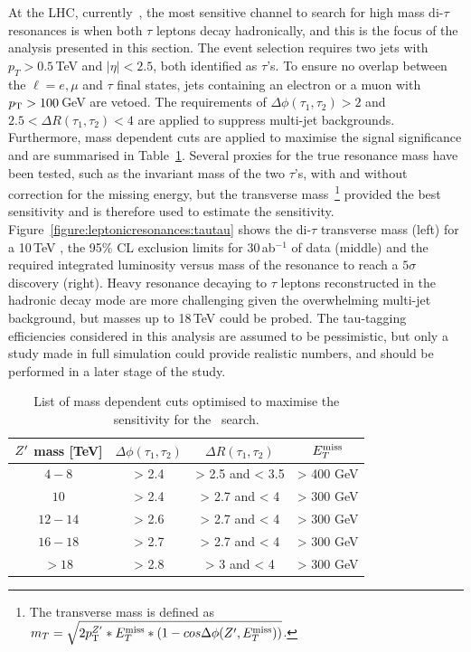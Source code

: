 At the LHC, currently~\cite{Khachatryan:2016qkc}, the most sensitive channel to search for high mass di-$\tau$ resonances is when both $\tau$ leptons decay hadronically, and this is the focus of the analysis presented in this section. The event selection requires two jets with $p_{T} > 0.5$\,TeV and $|\eta|<2.5$, both identified as $\tau$'s. To ensure no overlap between the $\ell=e,\mu$ and $\tau$ final states, jets containing an electron or a muon with $p_{\text{T}} > 100$\,GeV are vetoed. The requirements of $\Delta \phi(\tau_1, \tau_2)> 2$ and $2.5<\Delta R(\tau_1, \tau_2)<4$ are applied to suppress multi-jet backgrounds. Furthermore, mass dependent cuts are applied to maximise the signal significance and are summarised in Table~\ref{tab:leptonicresonances:tautau}. Several proxies for the true resonance mass have been tested, such as the invariant mass of the two $\tau$'s, with and without correction for the missing energy, but the transverse mass~\footnote{The transverse mass is defined as $m_{T}  =  \sqrt{2p_{\text{T}}^{Z^{\prime}}*E_{T}^{\rm{miss}}*(1-cos\Delta\phi(Z^{\prime},E_{T}^{\rm{miss}}))} $.} provided the best sensitivity and is therefore used to estimate the sensitivity.
Figure~\ref{figure:leptonicresonances:tautau} shows the di-$\tau$ transverse mass (left) for a 10\,TeV \ZpSSM, the 95\% CL exclusion limits for 30\,ab$^{-1}$ of data (middle) and the required integrated luminosity versus mass of the resonance to reach a $5\sigma$ discovery (right). Heavy resonance decaying to $\tau$ leptons reconstructed in the hadronic decay mode are more challenging given the overwhelming multi-jet background, but masses up to 18\,TeV could be probed. The tau-tagging efficiencies considered in this analysis are assumed to be pessimistic, but only a study made in full simulation could provide realistic numbers, and should be performed in a later stage of the study.

\begin{table}[htb!]
   \centering
\begin{tabular}{c|c|c|c}
   $Z^{\prime}$ mass [TeV] &  $\Delta \phi(\tau_1, \tau_2)$&  $\Delta R(\tau_1, \tau_2)$ & $E_{T}^{\rm{miss}}$\\
  \hline
  \hline
  $4-8$ & > 2.4 & > 2.5 and < 3.5 & > 400 GeV\\
  $10$ & > 2.4 & > 2.7 and < 4 & > 300 GeV\\
  $12-14$ & > 2.6 & > 2.7 and < 4 & > 300 GeV\\
  $16-18$ & > 2.7 & > 2.7 and < 4 & > 300 GeV\\
  $>18$ & > 2.8 & > 3 and < 4 & > 300 GeV\\
  \end{tabular}
  \caption{List of mass dependent cuts optimised to maximise the sensitivity for the \Zptata\ search.}
  \label{tab:leptonicresonances:tautau}
\end{table}


